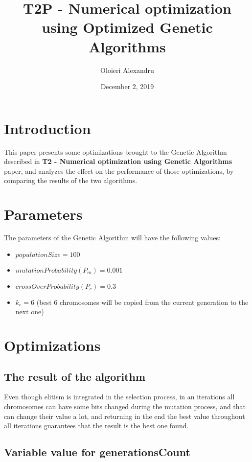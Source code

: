\documentclass[a4paper]{article}
\title{T2P - Numerical optimization using Optimized Genetic Algorithms}
\author{Oloieri Alexandru}
\date{December 2, 2019}
\begin{document}
	
	\maketitle
	
	\section{Introduction}
	
	This paper presents some optimizations brought to the Genetic Algorithm described in \textbf{T2 - Numerical optimization using Genetic Algorithms} paper, and analyzes the effect on the performance of those optimizations, by comparing the results of the two algorithms.
	
	\section{Parameters}
	
	The parameters of the Genetic Algorithm will have the following values:
	
	\begin{itemize}
		\item $populationSize = 100$
		\item $ mutationProbability (P_{m}) = 0.001 $
		\item $ crossOverProbability (P_{c}) = 0.3$
		\item $ k_{e} = 6 $ (best 6 chromosomes will be copied from the current generation to the next one)
	\end{itemize}
	
	\section{Optimizations}
	
	\subsection{The result of the algorithm}
	
	Even though elitism is integrated in the selection process, in an iterations all chromosomes can have some bits changed during the mutation process, and that can change their value a lot, and returning in the end the best value throughout all iterations guarantees that the result is the best one found.
	
	\subsection{Variable value for generationsCount}
	
\end{document}
